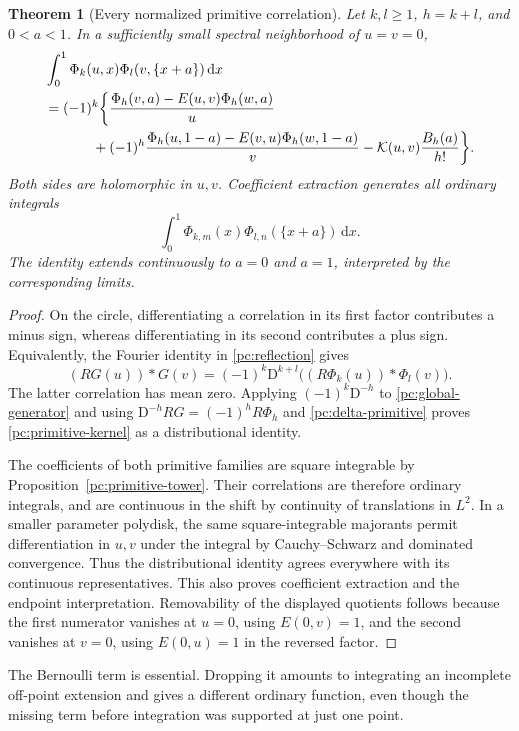 \documentclass[11pt,a4paper]{article}
\numberwithin{equation}{section}
\newtheorem{theorem}{Theorem}[section]
\theoremstyle{definition}
\newcommand{\dd}{\,\mathrm d}
\newcommand{\D}{\mathrm D}
\newcommand{\JF}{\mathcal K}
\begin{document}
\begin{theorem}[Every normalized primitive correlation]\label{pc:primitive-correlation}
Let $k,l\ge1$, $h=k+l$, and $0<a<1$. In a sufficiently small spectral neighborhood of $u=v=0$,
\begin{align}
&\int_0^1\Phi_k(u,x)\Phi_l(v,\{x+a\})\dd x\notag\\
&=(-1)^k\bigg\{
\frac{\Phi_h(v,a)-E(u,v)\Phi_h(w,a)}u\notag\\
&\hspace{12mm}+(-1)^h
\frac{\Phi_h(u,1-a)-E(v,u)\Phi_h(w,1-a)}v
-\JF(u,v)\frac{B_h(a)}{h!}\bigg\}.\label{pc:primitive-kernel}
\end{align}
Both sides are holomorphic in $u,v$. Coefficient extraction generates all ordinary integrals
\begin{equation}\label{pc:ordinary-coeff}
\int_0^1\Phi_{k,m}(x)\Phi_{l,n}(\{x+a\})\dd x.
\end{equation}
The identity extends continuously to $a=0$ and $a=1$, interpreted by the corresponding limits.
\end{theorem}
\begin{proof}
On the circle, differentiating a correlation in its first factor contributes a minus sign, whereas differentiating in its second contributes a plus sign. Equivalently, the Fourier identity in \eqref{pc:reflection} gives
\[
(RG(u))*G(v)=(-1)^k\D^{k+l}\big((R\Phi_k(u))*\Phi_l(v)\big).
\]
The latter correlation has mean zero. Applying $(-1)^k\D^{-h}$ to \eqref{pc:global-generator} and using
$\D^{-h}RG=(-1)^hR\Phi_h$ and \eqref{pc:delta-primitive} proves \eqref{pc:primitive-kernel} as a distributional identity.

The coefficients of both primitive families are square integrable by Proposition~\ref{pc:primitive-tower}. Their correlations are therefore ordinary integrals, and are continuous in the shift by continuity of translations in $L^2$. In a smaller parameter polydisk, the same square-integrable majorants permit differentiation in $u,v$ under the integral by Cauchy--Schwarz and dominated convergence. Thus the distributional identity agrees everywhere with its continuous representatives. This also proves coefficient extraction and the endpoint interpretation. Removability of the displayed quotients follows because the first numerator vanishes at $u=0$, using $E(0,v)=1$, and the second vanishes at $v=0$, using $E(0,u)=1$ in the reversed factor.
\end{proof}
The Bernoulli term is essential. Dropping it amounts to integrating an incomplete off-point extension and gives a different ordinary function, even though the missing term before integration was supported at just one point.
\end{document}
